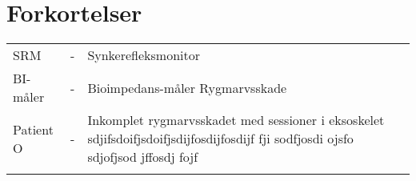 \chapter{Forkortelser}

\begin{table}[H]
\center
{}
\begin{tabularx}{\linewidth}{l l X}	
SRM         & - &   Synkerefleksmonitor \\ \addlinespace[2mm]
BI-måler         & - &   Bioimpedans-måler Rygmarvsskade \\ \addlinespace[2mm]
Patient O   & - &   Inkomplet rygmarvsskadet med sessioner i eksoskelet sdjifsdoifjsdoifjsdijfosdijfosdijf fji sodfjosdi ojsfo sdjofjsod jffosdj fojf \\ \addlinespace[2mm]

\end{tabularx}
\end{table}